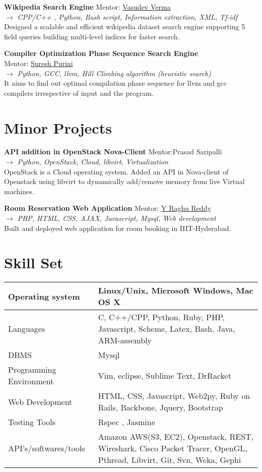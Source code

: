 \documentclass[margin]{res}
\begin{document}
\begin{resume}
{\bf Wikipedia Search Engine} \hfill{Mentor: \href{http://faculty.iiit.ac.in/~vv/Home.html}{Vasudev Verma}} \\
$\rightarrow$ {\it CPP/C++ , Python, Bash script, Information extraction, XML, Tf-idf } \\
Designed a scalable and efficient wikipedia dataset search engine supporting 5 field queries building multi-level indices for faster search. 

{\bf Compiler Optimization Phase Sequence Search Engine} \\
{ Mentor: \href{http://iiit.ac.in/people/faculty/psuresh}{Suresh Purini}} \\
$\rightarrow$ {\it Python, GCC, llvm, Hill Climbing algorithm (heuristic search) } \\
It aims to find out optimal compilation phase sequence for llvm and gcc compilers irrespective of input and the program.  



\section{Minor Projects}
{\bf API addition in OpenStack Nova-Client} \hfill{Mentor:Prasad Saripalli} \\
$\rightarrow$ {\it Python, OpenStack, Cloud,  libvirt, Virtualization } \\
OpenStack is a Cloud operating system. Added an API in Nova-client of Openstack using libvirt to dynamically add/remove memory from live Virtual machines.

{\bf Room Reservation Web Application} \hfill{Mentor: \href{http://faculty.iiit.ac.in/~raghu.reddy/Home.html}{Y Raghu Reddy}} \\ 
$\rightarrow$ {\it PHP, HTML, CSS, AJAX, Javascript, Mysql, Web development } \\
Built and deployed web application for room booking in IIIT-Hyderabad.

\section{
Skill Set}

\begin{table}[htbp]
\begin{tabular}[ht]{|l | p{7cm} |}
\hline
Operating system & Linux/Unix, Microsoft Windows, Mac OS X \\
\hline
Languages & C, C++/CPP, Python, Ruby, PHP, Javascript, Scheme, Latex, Bash, Java, ARM-assembly \\
\hline
DBMS & Mysql \\
\hline
Programming Environment & Vim, eclipse, Sublime Text, DrRacket \\
\hline
Web Development & HTML, CSS, Javascript, Web2py, Ruby on Rails, Backbone, Jquery, Bootstrap \\
\hline
Testing Tools & Rspec , Jasmine \\
\hline
API's/softwares/tools
& Amazon AWS(S3, EC2),
Openstack, REST, Wireshark, Cisco Packet Tracer,
OpenGL, Pthread, Libvirt, Git, Svn, Weka, Gephi \\
\hline


\end{tabular}
\end{table}
\end{resume}
\end{document}
